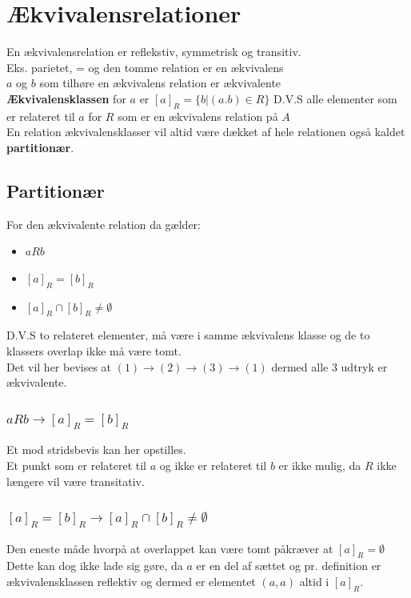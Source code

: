 \documentclass[12pt, a4paper]{article}
\begin{document}
			\section{Ækvivalensrelationer}
				En ækvivalensrelation er reflekstiv, symmetrisk og transitiv.\\
				Eks. parietet, = og den tomme relation er en ækvivalens\\
				$a$ og $b$ som tilhøre en ækvivalens relation er ækvivalente\\
				\textbf{Ækvivalensklassen} for $a$ er $[a]_R=\{b|(a.b)\in R\}$ D.V.S alle elementer som er relateret til $a$ for $R$ som er en ækvivalens relation på $A$\\ 
				En relation ækvivalensklasser vil altid være dækket af hele relationen også kaldet \textbf{partitionær}.\\
				\subsection{Partitionær}
					For den ækvivalente relation da gælder: \\
					\begin{itemize}
						\item $a R b$
						\item $[a]_R=[b]_R$
						\item $[a]_R\cap [b]_R\neq \emptyset$
					\end{itemize}
					D.V.S to relateret elementer, må være i samme ækvivalens klasse og de to klassers overlap ikke må være tomt.\\
					Det vil her bevises at $(1)\rightarrow (2)\rightarrow (3)\rightarrow (1)$ dermed alle 3 udtryk er ækvivalente.
					\subsubsection{$a R b\rightarrow [a]_R=[b]_R$}
						Et \; mod \;stridsbevis kan her opstilles.\\
						Et punkt som er relateret til $a$ og ikke er relateret til $b$ er ikke mulig, da $R$ ikke længere vil være transitativ.
					\subsubsection{$[a]_R=[b]_R\rightarrow [a]_R\cap [b]_R\neq \emptyset$}
						Den eneste måde hvorpå at overlappet kan være tomt påkræver at $[a]_R=\emptyset$\\
						Dette kan dog ikke lade sig gøre, da $a$ er en del af sættet og pr. definition er ækvivalensklassen reflektiv og dermed er elementet $(a,a)$ altid i $[a]_R$.
\end{document}
